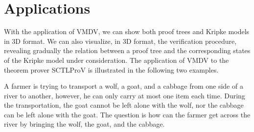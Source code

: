 \documentclass[runningheads]{llncs}
\newcommand\tool[1]{\textsf{#1}}
\newcommand\vmdv{\tool{VMDV}}
\begin{document}
 

\section{Applications}
With the application of \textsf{VMDV}, we can show both proof trees and Kripke models in 3D format.
We can also visualize, in 3D format, the verification procedure,
revealing gradually the relation between a proof tree and the corresponding states of the Kripke model under consideration.
The application of \vmdv{} to the theorem prover \textsf{SCTLProV} is illustrated in the following two examples.
 
\begin{example}
\label{expl:river}
A farmer is trying to transport a wolf, a goat, and a cabbage from one side of a river to another, however, he can only carry at most one item each time. During the transportation, the goat cannot be left alone with the wolf, nor the cabbage can be left alone with the goat.
The question is how can the farmer get across the river by bringing the wolf, the goat, and the cabbage.
\end{example}
 
\end{document}
